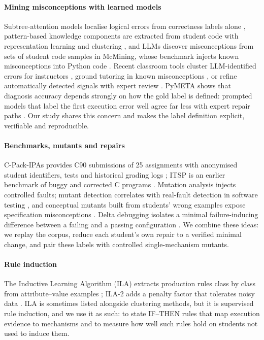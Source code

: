 \paragraph{Mining misconceptions with learned models}
Subtree-attention models localise logical errors from correctness labels alone \citep{hoq2025sann}, pattern-based knowledge components are extracted from student code with representation learning and clustering \citep{edm2026patternkc}, and LLMs discover misconceptions from sets of student code samples in McMining, whose benchmark injects known misconceptions into Python code \citep{alhossami2026mcmining}. Recent classroom tools cluster LLM-identified errors for instructors \citep{sigcse2026realtime}, ground tutoring in known misconceptions \citep{sigcse2026tutor}, or refine automatically detected signals with expert review \citep{aruleba2026ukicer}. PyMETA shows that diagnosis accuracy depends strongly on how the gold label is defined: prompted models that label the first execution error well agree far less with expert repair paths \citep{li2026pymeta}. Our study shares this concern and makes the label definition explicit, verifiable and reproducible.

\paragraph{Benchmarks, mutants and repairs}
C-Pack-IPAs provides C90 submissions of 25 assignments with anonymised student identifiers, tests and historical grading logs \citep{orvalho2024cpack}; ITSP is an earlier benchmark of buggy and corrected C programs \citep{yi2017itsp}. Mutation analysis injects controlled faults; mutant detection correlates with real-fault detection in software testing \citep{just2014mutants}, and conceptual mutants built from students' wrong examples expose specification misconceptions \citep{prasad2024conceptual}. Delta debugging isolates a minimal failure-inducing difference between a failing and a passing configuration \citep{zeller2002ddmin}. We combine these ideas: we replay the corpus, reduce each student's own repair to a verified minimal change, and pair these labels with controlled single-mechanism mutants.

\paragraph{Rule induction}
The Inductive Learning Algorithm (ILA) extracts production rules class by class from attribute--value examples \citep{tolun1998ila}; ILA-2 adds a penalty factor that tolerates noisy data \citep{tolun1999ila2}. ILA is sometimes listed alongside clustering methods, but it is supervised rule induction, and we use it as such: to state IF--THEN rules that map execution evidence to mechanisms and to measure how well such rules hold on students not used to induce them.

